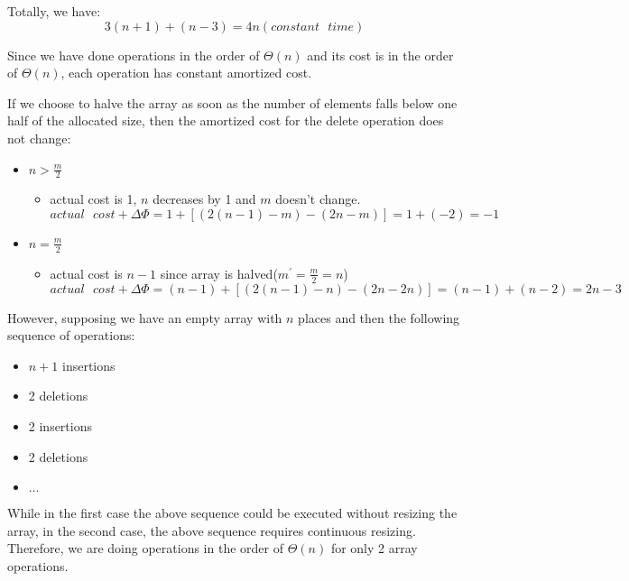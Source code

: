 Totally, we have:
$$
3(n+1) + (n-3) = 4n (constant\text{ }time)
$$

Since we have done operations in the order of $\Theta(n)$ and its cost is in the order of $\Theta(n)$, each operation has constant amortized cost.

If we choose to halve the array as soon as the number of elements falls below one half of the allocated size, then the amortized cost for the delete operation does not change:
\begin{itemize}
\item $n > \frac{m}{2}$
\begin{itemize}
\item actual cost is 1, $n$ decreases by 1 and $m$ doesn't change.
$$
actual\text{ }cost + \Delta\Phi = 1 + [(2(n-1)-m) - (2n-m)] = 1 + (-2) = -1
$$
\end{itemize}

\item $n = \frac{m}{2}$
\begin{itemize}
\item actual cost is $n-1$ since array is halved($m^{'} = \frac{m}{2} = n$)
$$
actual\text{ }cost + \Delta\Phi = (n-1) + [(2(n-1)-n) - (2n-2n)] = (n-1) + (n-2) = 2n - 3
$$
\end{itemize}
\end{itemize}

However, supposing we have an empty array with $n$ places and then the following sequence of operations: 
\begin{itemize}
\item $n + 1$ insertions
\item 2 deletions
\item 2 insertions
\item 2 deletions
\item $\dots$
\end{itemize}

While in the first case the above sequence could be executed without resizing the array, in the second case, the above sequence requires continuous resizing. Therefore, we are doing operations in the order of $\Theta(n)$ for only 2 array operations.